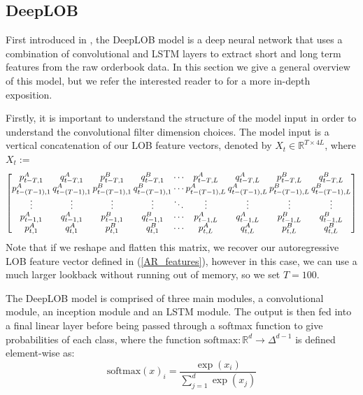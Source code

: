 \subsection{DeepLOB}
First introduced in \cite{ZHANG2019}, the DeepLOB model is a deep neural network
that uses a combination of convolutional and LSTM layers to extract short and long term
features from the raw orderbook data.
In this section we give a general overview of this model, but we refer the interested
reader to \cite{ZHANG2019} for a more in-depth exposition.

Firstly, it is important to understand the structure of the model input in order
to understand the convolutional filter dimension choices.
The model input is a vertical concatenation of our LOB feature
vectors, denoted by $X_t \in \mathbb{R}^{T \times 4L}$, where $X_t :=$
\begin{equation*}
\begingroup
\setlength\arraycolsep{1pt}
\begin{bmatrix}
p_{t-T, 1}^A & q_{t-T, 1}^A & p_{t-T, 1}^B &  q_{t-T, 1}^B &  \cdots & p_{t-T, L}^A &  q_{t-T, L}^A & p_{t-T, L}^B & q_{t-T, L}^B\\
p_{t-(T-1), 1}^A & q_{t-(T-1), 1}^A & p_{t-(T-1), 1}^B &  q_{t-(T-1), 1}^B &  \cdots & p_{t-(T-1), L}^A &  q_{t-(T-1), L}^A & p_{t-(T-1), L}^B & q_{t-(T-1), L}^B\\
\vdots & \vdots & \vdots & \vdots & \ddots & \vdots & \vdots& \vdots & \vdots\\
p_{t-1, 1}^A & q_{t-1, 1}^A & p_{t-1, 1}^B &  q_{t-1, 1}^B &  \cdots & p_{t-1, L}^A &  q_{t-1, L}^A & p_{t-1, L}^B & q_{t-1, L}^B\\
p_{t, 1}^A & q_{t, 1}^A & p_{t, 1}^B &  q_{t, 1}^B &  \cdots & p_{t, L}^A &  q_{t, L}^A & p_{t, L}^B & q_{t, L}^B\\
\end{bmatrix}
\endgroup
\end{equation*}
Note that if we reshape and flatten this matrix, we recover our autoregressive LOB feature vector defined in (\ref{AR_features}),
however in this case, we can use a much larger lookback without running out of memory, so we set $T=100$.

The DeepLOB model is comprised of three main modules, a convolutional module, an inception module and
an LSTM module. The output is then fed into a final linear layer before being passed through a softmax
function to give probabilities of each class, where the function $\text{softmax}: \mathbb{R}^d \to \Delta^{d-1}$
is defined element-wise as:
\begin{equation}
   \text{softmax}(x)_i = \frac{\exp(x_i)}{\sum_{j=1}^{d} \exp(x_j)}
\end{equation}

